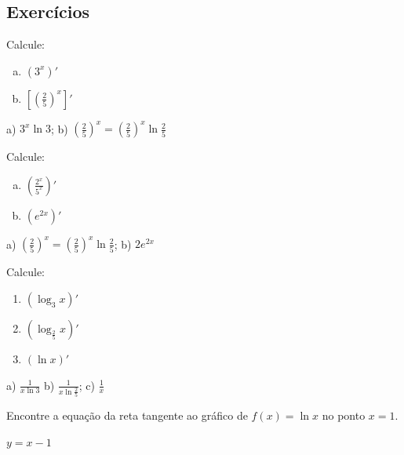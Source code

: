 \subsection*{Exercícios}

\begin{exer}
  Calcule:
  \begin{enumerate}[a)]
  \item $\displaystyle \left(3^x\right)'$
  \item $\displaystyle \left[\left(\frac{2}{5}\right)^x\right]'$
  \end{enumerate}
\end{exer}
\begin{resp}
  a) $3^x\ln 3$; b) $\left(\frac{2}{5}\right)^x = \left(\frac{2}{5}\right)^x\ln\frac{2}{5}$
\end{resp}

\begin{exer}
  Calcule:
  \begin{enumerate}[a)]
  \item $\displaystyle \left(\frac{2^x}{5^x}\right)'$\\
  \item $\displaystyle \left(e^{2x}\right)'$
  \end{enumerate}
\end{exer}
\begin{resp}
  a) $\left(\frac{2}{5}\right)^x = \left(\frac{2}{5}\right)^x\ln\frac{2}{5}$; b) $2e^{2x}$
\end{resp}

\begin{exer}
  Calcule:
  \begin{enumerate}
  \item $\displaystyle\left(\log_3 x\right)'$
  \item $\displaystyle\left(\log_{\frac{2}{5}} x\right)'$
  \item $\displaystyle (\ln x)'$
  \end{enumerate}
\end{exer}
\begin{resp}
  a) $\displaystyle \frac{1}{x\ln 3}$ b) $\displaystyle\frac{1}{x\ln \frac{2}{5}}$; c) $\frac{1}{x}$
\end{resp}

\begin{exer}
  Encontre a equação da reta tangente ao gráfico de $f(x) = \ln x$ no ponto $x=1$.
\end{exer}
\begin{resp}
  $y = x-1$
\end{resp}

